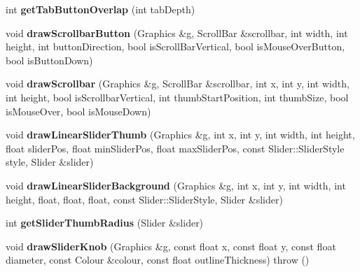 \begin{DoxyCompactItemize}
\item 
\hypertarget{classCustomLookAndFeel_a1d8165c009dc226434f73a6b90444c5e}{int {\bfseries get\-Tab\-Button\-Overlap} (int tab\-Depth)}\label{classCustomLookAndFeel_a1d8165c009dc226434f73a6b90444c5e}

\item 
\hypertarget{classCustomLookAndFeel_a6a725a762f4a681385b0dc28998a2c87}{void {\bfseries draw\-Scrollbar\-Button} (Graphics \&g, Scroll\-Bar \&scrollbar, int width, int height, int button\-Direction, bool is\-Scroll\-Bar\-Vertical, bool is\-Mouse\-Over\-Button, bool is\-Button\-Down)}\label{classCustomLookAndFeel_a6a725a762f4a681385b0dc28998a2c87}

\item 
\hypertarget{classCustomLookAndFeel_a264ec5aef0a2c35ab5cdb46c086fd756}{void {\bfseries draw\-Scrollbar} (Graphics \&g, Scroll\-Bar \&scrollbar, int x, int y, int width, int height, bool is\-Scrollbar\-Vertical, int thumb\-Start\-Position, int thumb\-Size, bool is\-Mouse\-Over, bool is\-Mouse\-Down)}\label{classCustomLookAndFeel_a264ec5aef0a2c35ab5cdb46c086fd756}

\item 
\hypertarget{classCustomLookAndFeel_a36c450599faf6763631bad3469bc697e}{void {\bfseries draw\-Linear\-Slider\-Thumb} (Graphics \&g, int x, int y, int width, int height, float slider\-Pos, float min\-Slider\-Pos, float max\-Slider\-Pos, const Slider\-::\-Slider\-Style style, Slider \&slider)}\label{classCustomLookAndFeel_a36c450599faf6763631bad3469bc697e}

\item 
\hypertarget{classCustomLookAndFeel_a21a063ecef1bf98e3b63443dafdc2a6b}{void {\bfseries draw\-Linear\-Slider\-Background} (Graphics \&g, int x, int y, int width, int height, float, float, float, const Slider\-::\-Slider\-Style, Slider \&slider)}\label{classCustomLookAndFeel_a21a063ecef1bf98e3b63443dafdc2a6b}

\item 
\hypertarget{classCustomLookAndFeel_aa19bb222a239cdf0c749d478780356fd}{int {\bfseries get\-Slider\-Thumb\-Radius} (Slider \&slider)}\label{classCustomLookAndFeel_aa19bb222a239cdf0c749d478780356fd}

\item 
\hypertarget{classCustomLookAndFeel_aa88e40058d027736cbbacdd55a6127fc}{void {\bfseries draw\-Slider\-Knob} (Graphics \&g, const float x, const float y, const float diameter, const Colour \&colour, const float outline\-Thickness)  throw ()}\label{classCustomLookAndFeel_aa88e40058d027736cbbacdd55a6127fc}


\end{DoxyCompactItemize}
